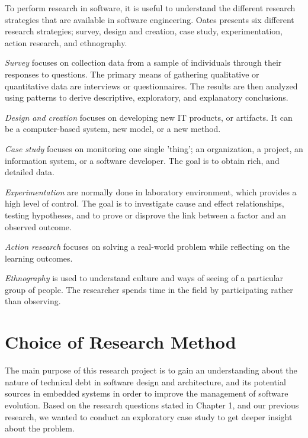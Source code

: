 To perform research in software, it is useful to understand the different research strategies that are available in software engineering. Oates\cite{Oates:2006:RIS:1202299} presents six different research strategies; survey, design and creation, case study, experimentation, action research, and ethnography. 

\textit{{Survey}} focuses on collection data from a sample of individuals through their responses to questions. The primary means of gathering qualitative or quantitative data are interviews or questionnaires. The results are then analyzed using patterns to derive descriptive, exploratory, and explanatory conclusions. 

\textit{{Design and creation}} focuses on developing new IT products, or artifacts. It can be a computer-based system, new model, or a new method. 

\textit{{Case study}} focuses on monitoring one single 'thing'; an organization, a project, an information system, or a software developer. The goal is to obtain rich, and detailed data. 

\textit{{Experimentation}} are normally done in laboratory environment, which provides a high level of control. The goal is to investigate cause and effect relationships, testing hypotheses, and to prove or disprove the link between a factor and an observed outcome. 

\textit{{Action research}} focuses on solving a real-world problem while reflecting on the learning outcomes. 

\textit{{Ethnography}} is used to understand culture and ways of seeing of a particular group of people. The researcher spends time in the field by participating rather than observing.








\section{Choice of Research Method}

The main purpose of this research project is to gain an understanding about the nature of technical debt in software design and architecture, and its potential sources in embedded systems in order to improve the management of software evolution. Based on the research questions stated in Chapter 1, and our previous research, we wanted to conduct an exploratory case study to get deeper insight about the problem.



